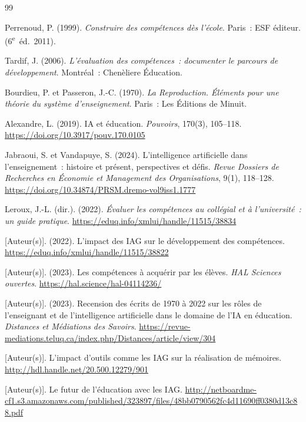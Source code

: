 \newpage
\begin{thebibliography}{99}

Perrenoud, P. (1999). \textit{Construire des comp\'etences d\`es l'\'ecole}.
Paris~: ESF \'editeur. (6\textsuperscript{e}~\'ed.\ 2011).

Tardif, J. (2006). \textit{L'\'evaluation des comp\'etences~: documenter le parcours de
d\'eveloppement}. Montr\'eal~: Chen\`eliere \'Education.

Bourdieu, P. et Passeron, J.-C. (1970). \textit{La Reproduction. \'El\'ements pour une
th\'eorie du syst\`eme d'enseignement}. Paris~: Les \'Editions de Minuit.

Alexandre, L. (2019). IA et \'education. \textit{Pouvoirs}, 170(3), 105--118.
\url{https://doi.org/10.3917/pouv.170.0105}

Jabraoui, S. et Vandapuye, S. (2024). L'intelligence artificielle dans l'enseignement~:
histoire et pr\'esent, perspectives et d\'efis. \textit{Revue Dossiers de Recherches en
\'Economie et Management des Organisations}, 9(1), 118--128.
\url{https://doi.org/10.34874/PRSM.dremo-vol9iss1.1777}

Leroux, J.-L. (dir.). (2022). \textit{\'Evaluer les comp\'etences au coll\'egial et \`a
l'universit\'e~: un guide pratique}.
\url{https://eduq.info/xmlui/handle/11515/38834}

[Auteur(s)]. (2022). L'impact des IAG sur le d\'eveloppement des comp\'etences. %
\url{https://eduq.info/xmlui/handle/11515/38822}

[Auteur(s)]. (2023). Les comp\'etences \`a acqu\'erir par les \'el\`eves. %
\textit{HAL Sciences ouvertes}.
\url{https://hal.science/hal-04114236/}

[Auteur(s)]. (2023). Recension des \'ecrits de 1970 \`a 2022 sur les r\^oles de %
l'enseignant et de l'intelligence artificielle dans le domaine de l'IA en \'education.
\textit{Distances et M\'ediations des Savoirs}.
\url{https://revue-mediations.teluq.ca/index.php/Distances/article/view/304}

[Auteur(s)]. L'impact d'outils comme les IAG sur la r\'ealisation de m\'emoires. %
\url{http://hdl.handle.net/20.500.12279/901}

[Auteur(s)]. Le futur de l'\'education avec les IAG. %
\url{http://netboardme-cf1.s3.amazonaws.com/published/323897/files/48bb0790562fc4d11690ff0380d13c88.pdf}

\end{thebibliography}


